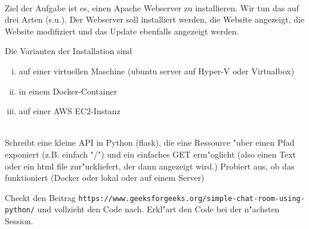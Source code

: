 \newcommand{\printpraesenzlsg}{false}
\newcommand{\printloesungen}{false}
\newcommand{\printbewertungen}{false}
\newcommand{\blattnummer}{1}



\iforiginal{}

	

 \\
Ziel der Aufgabe ist es, einen Apache Webserver zu installieren.
Wir tun das auf drei Arten (s.u.). Der Webserver soll installiert werden, die Website angezeigt, die Website modifiziert und das Update ebenfalls angezeigt werden.

Die Varianten der Installation sind
\begin{enumerate}[(i)]
  \item auf einer virtuellen Maschine (ubuntu server auf Hyper-V oder Virtualbox)
  \item in einem Docker-Container
  \item auf einer AWS EC2-Instanz
\end{enumerate}

\\
Schreibt eine kleine API in Python (flask), die eine Ressource "uber einen Pfad exponiert (z.B. einfach "/") und ein einfaches GET erm"oglicht (also einen Text oder ein html file zur"uckliefert, der dann angezeigt wird.)
Probiert aus, ob das funktioniert (Docker oder lokal oder auf einem Server)

Checkt den Beitrag \texttt{https://www.geeksforgeeks.org/simple-chat-room-using-python/} und vollzieht den Code nach. Erkl"art den Code bei der n"achsten Session.

